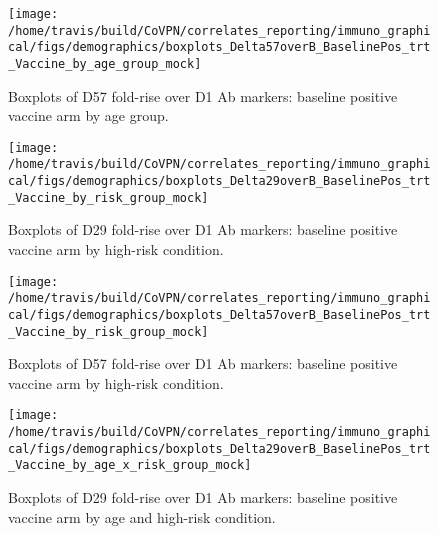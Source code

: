 \documentclass[]{book}
\theoremstyle{definition}
\theoremstyle{definition}
\theoremstyle{definition}
\newcommand{\1}{\mathbbm{1}}
\begin{document}
\clearpage
\begin{figure}[H]

{\centering \texttt{[image: /home/travis/build/CoVPN/correlates\_reporting/immuno\_graphical/figs/demographics/boxplots\_Delta57overB\_BaselinePos\_trt\_Vaccine\_by\_age\_group\_mock]} 

}

\caption{Boxplots of D57 fold-rise over D1 Ab markers: baseline positive vaccine arm by age group.}\label{fig:unnamed-chunk-167}
\end{figure}

\clearpage

\clearpage

\clearpage
\begin{figure}[H]

{\centering \texttt{[image: /home/travis/build/CoVPN/correlates\_reporting/immuno\_graphical/figs/demographics/boxplots\_Delta29overB\_BaselinePos\_trt\_Vaccine\_by\_risk\_group\_mock]} 

}

\caption{Boxplots of D29 fold-rise over D1 Ab markers: baseline positive vaccine arm by high-risk condition.}\label{fig:unnamed-chunk-170}
\end{figure}

\clearpage
\begin{figure}[H]

{\centering \texttt{[image: /home/travis/build/CoVPN/correlates\_reporting/immuno\_graphical/figs/demographics/boxplots\_Delta57overB\_BaselinePos\_trt\_Vaccine\_by\_risk\_group\_mock]} 

}

\caption{Boxplots of D57 fold-rise over D1 Ab markers: baseline positive vaccine arm by high-risk condition.}\label{fig:unnamed-chunk-171}
\end{figure}

\clearpage

\clearpage

\clearpage
\begin{figure}[H]

{\centering \texttt{[image: /home/travis/build/CoVPN/correlates\_reporting/immuno\_graphical/figs/demographics/boxplots\_Delta29overB\_BaselinePos\_trt\_Vaccine\_by\_age\_x\_risk\_group\_mock]} 

}

\caption{Boxplots of D29 fold-rise over D1 Ab markers: baseline positive vaccine arm by age and high-risk condition.}\label{fig:unnamed-chunk-174}
\end{figure}
\end{document}
